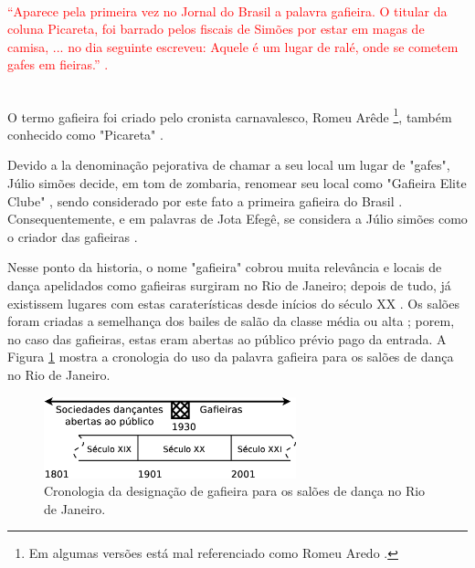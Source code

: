~\\

\textcolor{red}{``Aparece pela primeira vez no Jornal do Brasil a palavra gafieira. 
O titular da coluna Picareta, 
foi barrado pelos fiscais de Simões por estar em magas de camisa, ...
no dia seguinte escreveu: Aquele é um lugar de ralé, onde se cometem gafes em fieiras.'' \cite[pp. 188]{raca1999}.}

~\\

O termo gafieira foi criado pelo cronista carnavalesco, 
Romeu Arêde \footnote{Em algumas versões está mal referenciado como Romeu Aredo \cite[pp. 188]{raca1999}.}, 
também conhecido como "Picareta" \cite[pp. 18]{entrevistajuliojournalbrasil1} \cite[pp. 3]{juliosimoes} \cite[pp. 21]{efege1974maxixe} \cite[pp. 78]{coutinho2006cronistas}.

Devido a la denominação pejorativa de chamar a seu local um lugar de "gafes",
Júlio simões decide, em tom de zombaria, renomear seu local como "Gafieira Elite Clube" \cite[pp. 79]{moura1995tia},
sendo considerado por este fato a primeira gafieira do Brasil \cite{cabral2016elisete} \cite[pp. 84]{cabral1996escolas}.
Consequentemente, e em palavras de Jota Efegê, 
se considera a Júlio simões como o criador das gafieiras \cite[pp. 3]{juliosimoes}.

Nesse ponto da historia, 
o nome "gafieira" cobrou muita relevância e locais de dança apelidados como gafieiras surgiram no Rio de Janeiro;
depois de tudo, já existissem lugares com estas caraterísticas desde inícios do século XX \cite[pp. 49]{diniz2003almanaque}.
Os salões foram criadas a semelhança dos bailes de salão da classe média ou alta \cite[pp. 78]{coutinho2006cronistas}; 
porem, no caso das gafieiras, estas eram abertas ao público prévio pago da entrada.
A Figura \ref{fig:gafieiracrono} mostra a cronologia do uso da palavra gafieira para os salões de dança no Rio de Janeiro.
\begin{figure}[h]
  \centering
    \includegraphics[width=0.65\textwidth]{chapters/cap-intro/gafieira-crono.eps}
  \caption{Cronologia da designação de gafieira para os salões de dança no Rio de Janeiro.}
  \label{fig:gafieiracrono}
\end{figure}


